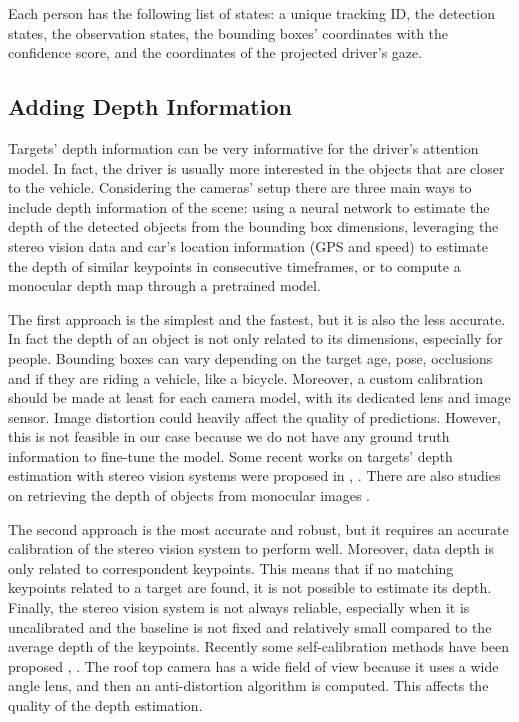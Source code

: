 Each person has the following list of states: a unique tracking ID, the 
detection states, the observation states, the bounding boxes' coordinates with 
the confidence score, and the coordinates of the projected driver's gaze.

\subsection{Adding Depth Information}
Targets' depth information can be very informative for the driver's attention 
model. In fact, the driver is usually more interested in the objects that are 
closer to the vehicle.
Considering the cameras' setup there are three main ways to include depth 
information of the scene: using a neural network to estimate the depth of the 
detected objects from the bounding box dimensions, leveraging the stereo vision 
data and car's location information (GPS and speed) to estimate the depth of 
similar keypoints in consecutive timeframes, or to compute a monocular depth 
map through a pretrained model.

The first approach is the simplest and the fastest, but it is also the less 
accurate. In fact the depth of an object is not only related to its dimensions, 
especially for people. Bounding boxes can vary depending on the target age, pose, 
occlusions and if they are riding a vehicle, like a bicycle. 
Moreover, a custom calibration should be made at least for each camera model, 
with its dedicated lens and image sensor. Image distortion could heavily affect 
the quality of predictions. However, this is not feasible in our case because 
we do not have any ground truth information to fine-tune the model.
Some recent works on targets' depth estimation with stereo vision systems were 
proposed in \cite{li2019stereo}, \cite{Peng_2020_CVPR}. There are also studies 
on retrieving the depth of objects from monocular images \cite{bbox_mde}.

The second approach is the most accurate and robust, but it requires an accurate 
calibration of the stereo vision system to perform well. Moreover, data depth 
is only related to correspondent keypoints. This means that if no matching 
keypoints related to a target are found, it is not possible to estimate its 
depth. Finally, the stereo vision system is not always reliable, especially when 
it is uncalibrated and the baseline is not fixed and relatively small compared to 
the average depth of the keypoints. 
Recently some self-calibration methods have been proposed 
\cite{sfm_self_calibration1}, \cite{sfm_self_calibration2}.
The roof top camera has a wide field of 
view because it uses a wide angle lens, and then an anti-distortion algorithm 
is computed. This affects the quality of the depth estimation.

